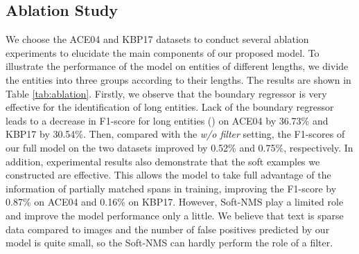\documentclass[11pt,a4paper]{article}
\begin{document}
\subsection{Ablation Study}

We choose the ACE04 and KBP17 datasets to conduct several ablation experiments to elucidate the main components of our proposed model. To illustrate the performance of the model on entities of different lengths, we divide the entities into three groups according to their lengths. The results are shown in Table \ref{tab:ablation}. Firstly, we observe that the boundary regressor is very effective for the identification of long entities. Lack of the boundary regressor leads to a decrease in F1-score for long entities () on ACE04 by 36.73\% and KBP17 by 30.54\%. Then, compared with the \textit{w/o filter} setting, the F1-scores of our full model on the two datasets improved by 0.52\% and 0.75\%, respectively. In addition, experimental results also demonstrate that the soft examples we constructed are effective. This allows the model to take full advantage of the information of partially matched spans in training, improving the F1-score by 0.87\% on ACE04 and 0.16\% on KBP17. However, Soft-NMS play a limited role and improve the model performance only a little. We believe that text is sparse data compared to images and the number of false positives predicted by our model is quite small, so the Soft-NMS can hardly perform the role of a filter.
\end{document}
